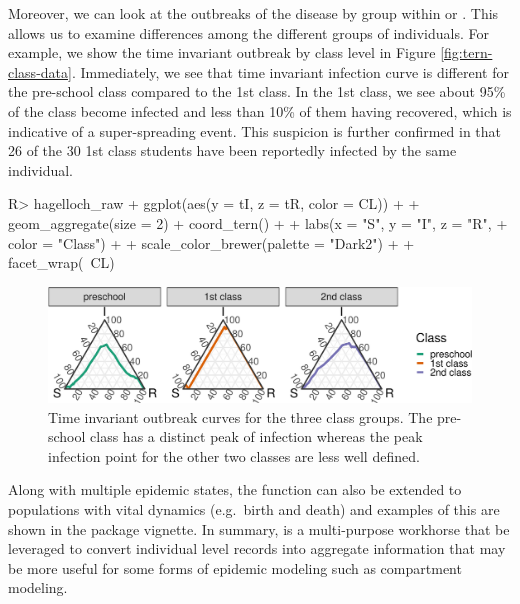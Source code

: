 \documentclass[
  shortnames]{jss}
\begin{document}
Moreover, we can look at the outbreaks of the disease by group within
 or . This allows us
to examine differences among the different groups of individuals. For
example, we show the time invariant outbreak by class level in Figure
\ref{fig:tern-class-data}. Immediately, we see that time invariant
infection curve is different for the pre-school class compared to the
1st class. In the 1st class, we see about 95\% of the class become
infected and less than 10\% of them having recovered, which is
indicative of a super-spreading event. This suspicion is further
confirmed in that 26 of the 30 1st class students have been reportedly
infected by the same individual.

\begin{CodeChunk}
\begin{CodeInput}
R> hagelloch_raw %
+   ggplot(aes(y = tI, z = tR, color = CL)) +
+   geom_aggregate(size = 2) + coord_tern() +
+   labs(x = "S", y = "I", z = "R",
+        color = "Class") +
+   scale_color_brewer(palette = "Dark2") +
+   facet_wrap(~CL)
\end{CodeInput}
\begin{figure}[H]

{\centering \includegraphics{Figs/unnamed-chunk-9-1} 

}

\caption{\label{fig:tern-class-data}Time invariant outbreak curves for the three class groups.  The pre-school class has a distinct peak of infection whereas the peak infection point for the other two classes are less well defined.}\label{fig:unnamed-chunk-9}
\end{figure}
\end{CodeChunk}

Along with multiple epidemic states, the function
 can also be extended to populations with
vital dynamics (e.g.~birth and death) and examples of this are shown in
the package vignette. In summary,  is a
multi-purpose workhorse that be leveraged to convert individual level
records into aggregate information that may be more useful for some
forms of epidemic modeling such as compartment modeling.
\end{document}
